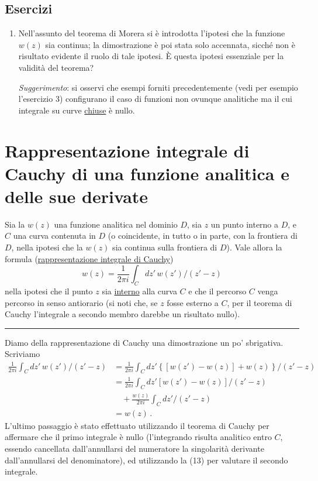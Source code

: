 \documentclass[11pt, a4paper]{book}
\numberwithin{equation}{section}
\newenvironment{esercizi}{\subsection*{Esercizi}\begin{enumerate}}{\end{enumerate}}
\begin{document}
\begin{esercizi}
\item Nell'assunto del teorema di Morera si è introdotta l'ipotesi che la funzione $w(z)$ sia continua; la dimostrazione è poi stata solo accennata, sicché non è risultato evidente il ruolo di tale ipotesi. È questa ipotesi essenziale per la validità del teorema?

\textit{Suggerimento}: si osservi che esempi forniti precedentemente (vedi per esempio l'esercizio 3) configurano il caso di funzioni non ovunque analitiche ma il cui integrale su curve \underline{chiuse} è nullo.

\end{esercizi}

\section{Rappresentazione integrale di Cauchy di una funzione analitica e delle sue derivate}

Sia la $w(z)$ una funzione analitica nel dominio $D$, sia $z$ un punto interno a $D$, e $C$ una curva contenuta in $D$ (o coincidente, in tutto o in parte, con la frontiera di $D$, nella ipotesi che la $w(z)$ sia continua sulla frontiera di $D$). Vale allora la formula (\underline{rappresentazione integrale di Cauchy})
\begin{equation}
w(z) = \frac{1}{2\pi i} \int_C dz'\, w(z') / (z' - z) \tag{1}
\end{equation}
nella ipotesi che il punto $z$ sia \underline{interno} alla curva $C$ e che il percorso $C$ venga percorso in senso antiorario (si noti che, se $z$ fosse esterno a $C$, per il teorema di Cauchy l'integrale a secondo membro darebbe un risultato nullo).

\medskip\hrule\medskip

Diamo della rappresentazione di Cauchy una dimostrazione un po' sbrigativa. Scriviamo
\begin{align*}
\frac{1}{2\pi i} \int_C dz'\, w(z')/(z'-z)
&= \frac{1}{2\pi i} \int_C dz' \left\{ \left[w(z')-w(z)\right]+w(z) \right\}/(z'-z) \\
&= \frac{1}{2\pi i} \int_C dz' \left[w(z')-w(z)\right]/(z'-z) \\
&\quad + \frac{w(z)}{2\pi i} \int_C dz'/(z'-z) \\
&= w(z)\,.
\end{align*}
L'ultimo passaggio è stato effettuato utilizzando il teorema di Cauchy per affermare che il primo integrale è nullo (l'integrando risulta analitico entro $C$, essendo cancellata dall'annullarsi del numeratore la singolarità derivante dall'annullarsi del denominatore), ed utilizzando la (13) per valutare il secondo integrale.
\end{document}
